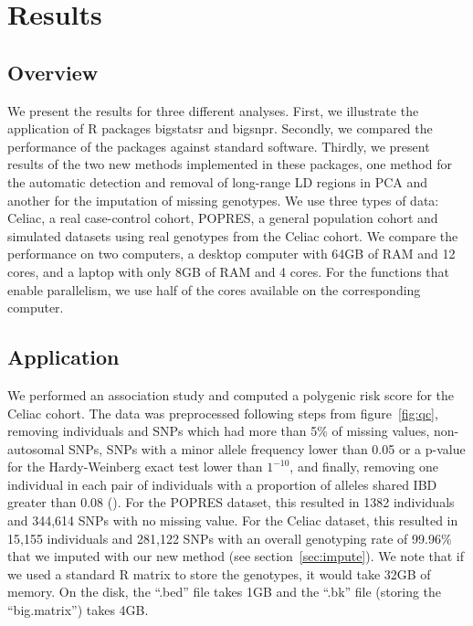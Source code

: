 \documentclass{bioinfo}
\begin{document}
\section{Results}

\subsection{Overview}

We present the results for three different analyses. First, we illustrate the application of R packages bigstatsr and bigsnpr. Secondly, we compared the performance of the packages against standard software. Thirdly, we present results of the two new methods implemented in these packages, one method for the automatic detection and removal of long-range LD regions in PCA and another for the imputation of missing genotypes. We use three types of data: Celiac, a real case-control cohort, POPRES, a general population cohort and simulated datasets using real genotypes from the Celiac cohort. We compare the performance on two computers, a desktop computer with 64GB of RAM and 12 cores, and a laptop with only 8GB of RAM and 4 cores. For the functions that enable parallelism, we use half of the cores available on the corresponding computer.

\subsection{Application}
 
We performed an association study and computed a polygenic risk score for the Celiac cohort. The data was preprocessed following steps from figure~\ref{fig:qc}, removing individuals and SNPs which had more than 5\% of missing values, non-autosomal SNPs, SNPs with a minor allele frequency lower than 0.05 or a p-value for the Hardy-Weinberg exact test lower than $1^{-10}$, and finally, removing one individual in each pair of individuals with a proportion of alleles shared IBD greater than 0.08 (\cite{Purcell2007}). 
For the POPRES dataset, this resulted in 1382 individuals and 344,614 SNPs with no missing value.
For the Celiac dataset, this resulted in 15,155 individuals and 281,122 SNPs with an overall genotyping rate of 99.96\% that we imputed with our new method (see section~\ref{sec:impute}). We note that if we used a standard R matrix to store the genotypes, it would take 32GB of memory. On the disk, the ``.bed'' file takes 1GB and the ``.bk'' file (storing the ``big.matrix'') takes 4GB. 
\end{document}
